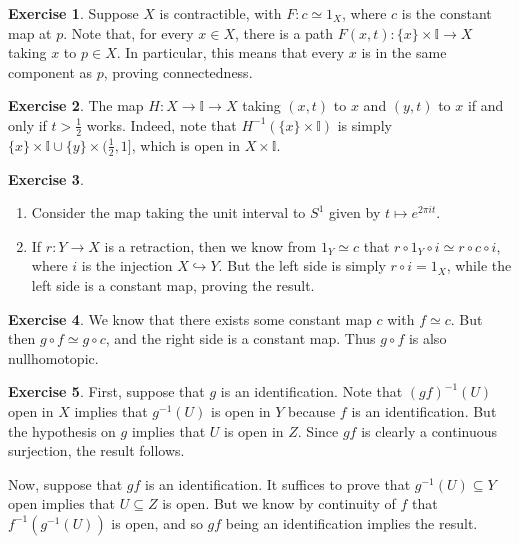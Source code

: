 \documentclass{article}
\theoremstyle{definition}
\newtheorem{intex}{Exercise}[section]
\newenvironment{exercise}{\begin{intex}\label{\theintex}}{\end{intex}}
\newcommand*\II{\mathbb I}
\begin{document}
\begin{exercise} \leavevmode
Suppose $X$ is contractible, with $F:c\simeq1_X$, where $c$ is the constant map at $p$. Note that, for every $x\in X$, there is a path $F(x,t):\{x\}\times\II\to X$ taking $x$ to $p\in X$. In particular, this means that every $x$ is in the same component as $p$, proving connectedness. 
\end{exercise} 

\begin{exercise} \leavevmode
The map $H:X\to\II\to X$ taking $(x,t)$ to $x$ and $(y,t)$ to $x$ if and only if $t>\frac12$ works. Indeed, note that $H^{-1}(\{x\}\times\II)$ is simply $\{x\}\times\II\cup\{y\}\times(\frac12,1]$, which is open in $X\times\II$. 
\end{exercise} 

\begin{exercise} \leavevmode
\begin{enumerate}
\item Consider the map taking the unit interval to $S^1$ given by $t\mapsto e^{2\pi it}$. 

\item If $r:Y\to X$ is a retraction, then we know from $1_Y\simeq c$ that $r\circ1_Y\circ i\simeq r\circ c\circ i$, where $i$ is the injection $X\hookrightarrow Y$. But the left side is simply $r\circ i=1_X$, while the left side is a constant map, proving the result. 
\end{enumerate} 
\end{exercise} 

\begin{exercise} \leavevmode
We know that there exists some constant map $c$ with $f\simeq c$. But then $g\circ f\simeq g\circ c$, and the right side is a constant map. Thus $g\circ f$ is also nullhomotopic. 
\end{exercise} 

\begin{exercise} \leavevmode
First, suppose that $g$ is an identification. Note that $(gf)^{-1}(U)$ open in $X$ implies that $g^{-1}(U)$ is open in $Y$ because $f$ is an identification. But the hypothesis on $g$ implies that $U$ is open in $Z$. Since $gf$ is clearly a continuous surjection, the result follows. 

Now, suppose that $gf$ is an identification. It suffices to prove that $g^{-1}(U)\subseteq Y$ open implies that $U\subseteq Z$ is open. But we know by continuity of $f$ that $f^{-1}(g^{-1}(U))$ is open, and so $gf$ being an identification implies the result. 
\end{exercise} 
\end{document}
